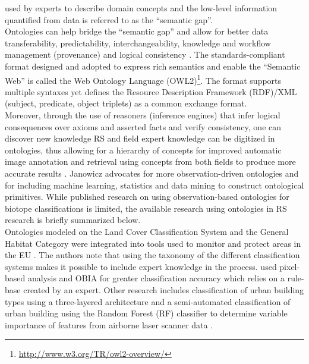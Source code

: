 \documentclass[authoryear, review,12pt,number]{elsarticle}
\begin{document}
used by experts to describe domain concepts and the low-level information
quantified from data is referred to as the ``semantic gap''.
\\
Ontologies can help bridge the ``semantic gap'' and allow for better data
transferability, predictability, interchangeability, knowledge and workflow
management (provenance) and logical consistency \citep{Janowicz2012}.  The
standards-compliant format designed and adopted to express rich semantics and
enable the ``Semantic Web'' is called the Web Ontology Language
(OWL2)\footnote{\url{http://www.w3.org/TR/owl2-overview/}}. The format supports
multiple syntaxes yet defines the Resource Description Framework (RDF)/XML
(subject, predicate, object triplets) as a common exchange format.
\\
Moreover, through the use of reasoners (inference engines) that infer logical
consequences over axioms and asserted facts and verify consistency, one can
discover new knowledge \citep{Arvor2013, Andres2013a}
RS and field expert
knowledge can be digitized in ontologies, thus allowing for a hierarchy of
concepts for improved automatic image annotation and retrieval using concepts
from both fields to produce more accurate results \citep{Srikanth_2005}.
Janowicz \cite{Janowicz2012} advocates for more observation-driven ontologies and for
including machine learning, statistics and data mining to construct ontological
primitives. While published research on using observation-based ontologies for
biotope classifications is limited, the available research using ontologies in
RS research is briefly summarized below.\\
Ontologies modeled on the Land Cover Classification System and the General
Habitat Category were integrated into tools used to monitor and protect areas in
the EU \citep{Arvor2013}. The authors note that using the taxonomy of the
different classification systems makes it possible to include expert knowledge
in the process. 
\cite{Lucas2015} used pixel-based analysis and OBIA for greater classification
accuracy which relies on a rule-base created by an expert. Other research
includes classification of urban building types using a three-layered
architecture \citep{diSciascio2013} and a semi-automated classification of urban
building using the Random Forest (RF) classifier to determine variable
importance of features from airborne laser scanner data \citep{Belgiu2014}.
\end{document}
